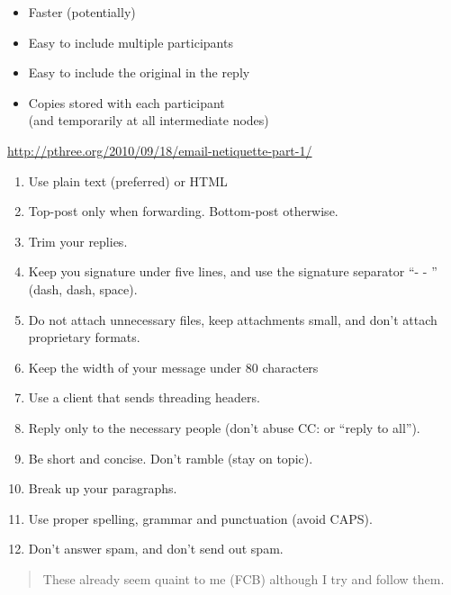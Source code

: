 \documentclass[a4paper,landscape,headrule,footrule,xetex]{foils}
\begin{document}
\begin{itemize}
\item Faster (potentially)
\item Easy to include multiple participants
\item Easy to include the original in the reply
\item Copies stored with each participant
  \\ (and temporarily at all intermediate nodes)
\end{itemize}

\url{http://pthree.org/2010/09/18/email-netiquette-part-1/}
\begin{enumerate}
\item Use plain text (preferred) or HTML
\item Top-post only when forwarding. Bottom-post otherwise.
\item Trim your replies.
\item Keep you signature under five lines, and use the signature separator “- -  ” (dash, dash, space).
\item Do not attach unnecessary files, keep attachments small, and don't attach proprietary formats.
\item Keep the width of your message under 80 characters
\item Use a client that sends threading headers.
\item Reply only to the necessary people (don't abuse CC: or “reply to all”).
\item Be short and concise. Don't ramble (stay on topic).
\item Break up your paragraphs.
\item Use proper spelling, grammar and punctuation (avoid CAPS).
\item Don't answer spam, and don't send out spam.
\end{enumerate}

\begin{quote}
  These already seem quaint to me (FCB) although I try and follow them.
\end{quote}
\end{document}
